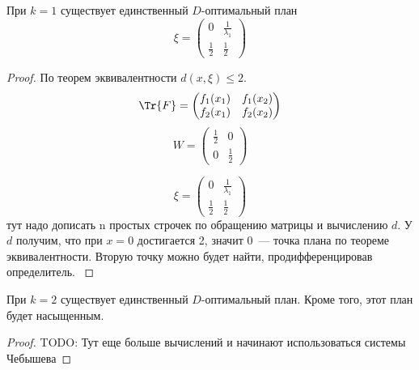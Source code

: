 \begin{thm}
При $k=1$ существует единственный $D$-оптимальный план
$$ \xi = \begin{pmatrix} 0 & \frac{1}{\lambda_1} \\ \frac{1}{2} & \frac{1}{2}\end{pmatrix}$$
\end{thm}

\begin{proof}
По теорем эквивалентности $d(x, \xi) \leq 2$.
$$\Tr{F} = \begin{pmatrix} f_1(x_1) & f_1(x_2) \\ f_2(x_1) & f_2(x_2)\end{pmatrix}$$
$$ W = \begin{pmatrix} \frac{1}{2} & 0 \\ 0 & \frac{1}{2} \end{pmatrix} $$

$$ \xi = \begin{pmatrix} 0 & \frac{1}{\lambda_1} \\ \frac{1}{2} & \frac{1}{2}\end{pmatrix}$$
{\color{blue} тут надо дописать n простых строчек по обращению матрицы и вычислению $d$. У $d$ получим, что при $x=0$ достигается 2, значит $0$ — точка плана по теореме эквивалентности. Вторую точку можно будет найти, продифференцировав определитель. }

\end{proof}



\begin{thm}
При $k=2$ существует единственный $D$-оптимальный план. Кроме того, этот план будет насыщенным.
\end{thm}


\begin{proof}
{\color{blue} TODO: Тут еще больше вычислений и начинают использоваться системы Чебышева}
\end{proof}
